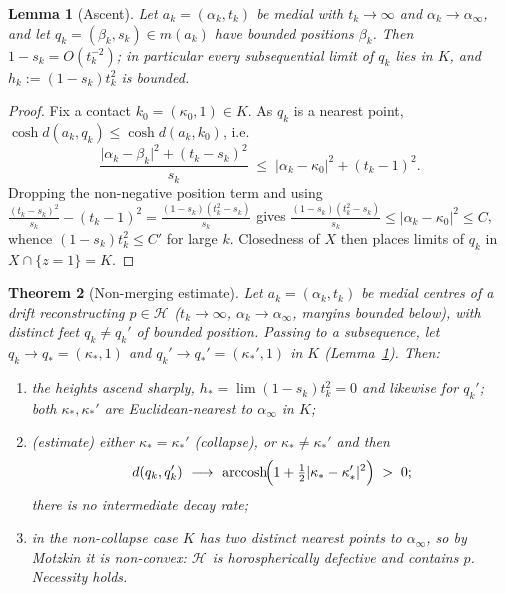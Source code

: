\documentclass[11pt]{article}
\newtheorem{theorem}{Theorem}[section]
\newtheorem{lemma}[theorem]{Lemma}
\theoremstyle{remark}
\newcommand{\X}{X}
\newcommand{\Hb}[1]{\mathcal{H}_{#1}}
\begin{document}
\begin{lemma}[Ascent]\label{lem:ascent}
Let $a_{k}=(\alpha_{k},t_{k})$ be medial with $t_{k}\to\infty$ and
$\alpha_{k}\to\alpha_{\infty}$, and let $q_{k}=(\beta_{k},s_{k})\in
m(a_{k})$ have bounded positions $\beta_{k}$. Then
$1-s_{k}=O(t_{k}^{-2})$; in particular every subsequential limit of
$q_{k}$ lies in $K$, and $h_{k}:=(1-s_{k})t_{k}^{2}$ is bounded.
\end{lemma}

\begin{proof}
Fix a contact $k_{0}=(\kappa_{0},1)\in K$. As $q_{k}$ is a nearest
point, $\cosh d(a_{k},q_{k})\le\cosh d(a_{k},k_{0})$, i.e.
\[
\frac{\lvert\alpha_{k}-\beta_{k}\rvert^{2}+(t_{k}-s_{k})^{2}}{s_{k}}
\;\le\;\lvert\alpha_{k}-\kappa_{0}\rvert^{2}+(t_{k}-1)^{2}.
\]
Dropping the non-negative position term and using
$\frac{(t_{k}-s_{k})^{2}}{s_{k}}-(t_{k}-1)^{2}=
\frac{(1-s_{k})(t_{k}^{2}-s_{k})}{s_{k}}$ gives
$\frac{(1-s_{k})(t_{k}^{2}-s_{k})}{s_{k}}\le
\lvert\alpha_{k}-\kappa_{0}\rvert^{2}\le C$, whence
$(1-s_{k})t_{k}^{2}\le C'$ for large $k$. Closedness of $\X$ then
places limits of $q_{k}$ in $\X\cap\{z=1\}=K$.
\end{proof}

\begin{theorem}[Non-merging estimate]\label{thm:nonmerge}
Let $a_{k}=(\alpha_{k},t_{k})$ be medial centres of a drift
reconstructing $p\in\Hb{}$ ($t_{k}\to\infty$, $\alpha_{k}\to
\alpha_{\infty}$, margins bounded below), with distinct feet
$q_{k}\neq q_{k}'$ of bounded position. Passing to a subsequence, let
$q_{k}\to q_{\ast}=(\kappa_{\ast},1)$ and $q_{k}'\to
q_{\ast}'=(\kappa_{\ast}',1)$ in $K$ (Lemma~\ref{lem:ascent}). Then:
\begin{enumerate}[label=(\alph*)]
\item the heights ascend sharply, $h_{\ast}=\lim(1-s_{k})t_{k}^{2}=0$
and likewise for $q_{k}'$; both $\kappa_{\ast},\kappa_{\ast}'$ are
Euclidean-nearest to $\alpha_{\infty}$ in $K$;
\item \emph{(estimate)} either $\kappa_{\ast}=\kappa_{\ast}'$
(\emph{collapse}), or $\kappa_{\ast}\neq\kappa_{\ast}'$ and then
\[
d(q_{k},q_{k}')\ \longrightarrow\
\operatorname{arccosh}\!\Bigl(1+\tfrac12\lvert\kappa_{\ast}-
\kappa_{\ast}'\rvert^{2}\Bigr)\;>\;0 ;
\]
there is no intermediate decay rate;
\item in the non-collapse case $K$ has two distinct nearest points to
$\alpha_{\infty}$, so by Motzkin it is non-convex: $\Hb{}$ is
horospherically defective and contains $p$. Necessity holds.
\end{enumerate}
\end{theorem}
\end{document}
